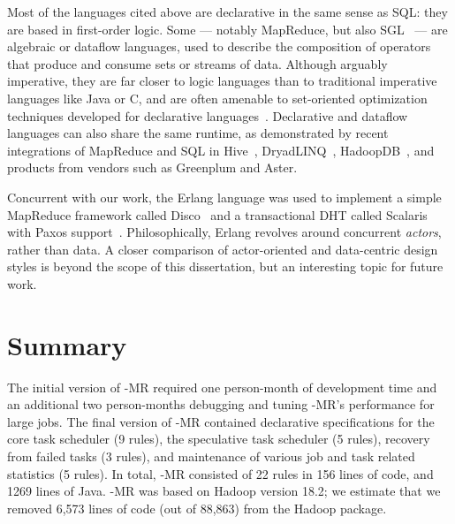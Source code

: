 Most of the languages cited above are declarative in the same sense as SQL: they are 
based in first-order logic. Some --- notably MapReduce, but also SGL~\cite{cornellgames} --- are
algebraic or dataflow languages, used to describe the composition of operators that produce and 
consume sets or streams of data.  Although arguably imperative, they are far closer to logic languages 
than to traditional imperative languages like Java or C, and are often amenable to set-oriented optimization 
techniques developed for declarative languages~\cite{cornellgames}. Declarative and dataflow languages 
can also share the same runtime, as demonstrated by recent integrations of MapReduce and SQL
in Hive~\cite{hive-vldb}, DryadLINQ~\cite{DryadLINQ}, HadoopDB~\cite{hadoopdb}, and products from vendors 
such as Greenplum and Aster.

Concurrent with our work, the Erlang language was used to implement a simple MapReduce framework called 
Disco~\cite{disco} and a transactional DHT called Scalaris with Paxos support~\cite{scalaris}. Philosophically, Erlang 
revolves around concurrent {\em actors}, rather than data. A closer comparison of actor-oriented and data-centric design 
styles is beyond the scope of this dissertation, but an interesting topic for future work.

\section{Summary}
\label{ch:boom:sec:conclusion}

The initial version of \BOOM-MR required one person-month of development time
and an additional two person-months debugging and tuning \BOOM-MR's performance
for large jobs.  The final version of \BOOM-MR contained declarative
specifications for the core task scheduler (9 rules), the speculative task
scheduler (5 rules), recovery from failed tasks (3 rules), and maintenance of
various job and task related statistics (5 rules).  In total, \BOOM-MR
consisted of 22 \OVERLOG rules in 156 lines of code, and 1269 lines of Java.
\BOOM-MR was based on Hadoop version 18.2; we estimate that we removed 6,573
lines of code (out of 88,863) from the  Hadoop
package.  


